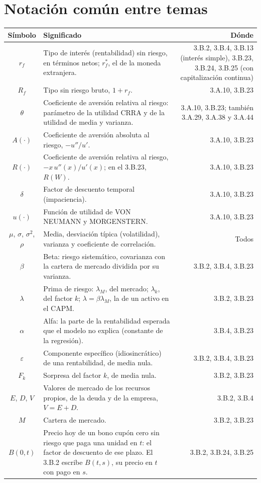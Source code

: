 \documentclass[10pt,a4paper]{article}
\newcommand{\cabecera}{\toprule\textbf{Símbolo} & \textbf{Significado} & \textbf{Dónde}\\\midrule\endhead\bottomrule\endfoot}
\begin{document}
\section{Notación común entre temas}
\begin{longtable}{SMD}
\cabecera
$r_f$ & Tipo de interés (rentabilidad) sin riesgo, en términos netos; $r_f^*$, el de la moneda extranjera. & 3.B.2, 3.B.4, 3.B.13 (interés simple), 3.B.23, 3.B.24, 3.B.25 (con capitalización continua)\\
$R_f$ & Tipo sin riesgo bruto, $1+r_f$. & 3.A.10, 3.B.23\\
$\theta$ & Coeficiente de aversión relativa al riesgo: parámetro de la utilidad CRRA y de la utilidad de media y varianza. & 3.A.10, 3.B.23; también 3.A.29, 3.A.38 y 3.A.44\\
$A(\cdot)$ & Coeficiente de aversión absoluta al riesgo, $-u''/u'$. & 3.A.10, 3.B.23\\
$R(\cdot)$ & Coeficiente de aversión relativa al riesgo, $-x\,u''(x)/u'(x)$; en el 3.B.23, $R(W)$. & 3.A.10, 3.B.23\\
$\delta$ & Factor de descuento temporal (impaciencia). & 3.A.10, 3.B.23\\
$u(\cdot)$ & Función de utilidad de VON NEUMANN y MORGENSTERN. & 3.A.10, 3.B.23\\
$\mu$, $\sigma$, $\sigma^2$, $\rho$ & Media, desviación típica (volatilidad), varianza y coeficiente de correlación. & Todos\\
$\beta$ & Beta: riesgo sistemático, covarianza con la cartera de mercado dividida por su varianza. & 3.B.2, 3.B.4, 3.B.23\\
$\lambda$ & Prima de riesgo: $\lambda_M$, del mercado; $\lambda_k$, del factor $k$; $\lambda=\beta\lambda_M$, la de un activo en el CAPM. & 3.B.2, 3.B.23\\
$\alpha$ & Alfa: la parte de la rentabilidad esperada que el modelo no explica (constante de la regresión). & 3.B.4, 3.B.23\\
$\varepsilon$ & Componente específico (idiosincrático) de una rentabilidad, de media nula. & 3.B.2, 3.B.4, 3.B.23\\
$F_k$ & Sorpresa del factor $k$, de media nula. & 3.B.2, 3.B.23\\
$E$, $D$, $V$ & Valores de mercado de los recursos propios, de la deuda y de la empresa, $V=E+D$. & 3.B.2, 3.B.4\\
$M$ & Cartera de mercado. & 3.B.2, 3.B.23\\
$B(0,t)$ & Precio hoy de un bono cupón cero sin riesgo que paga una unidad en $t$: el factor de descuento de ese plazo. El 3.B.2 escribe $B(t,s)$, su precio en $t$ con pago en $s$. & 3.B.2, 3.B.24, 3.B.25\\

\end{longtable}
\end{document}
